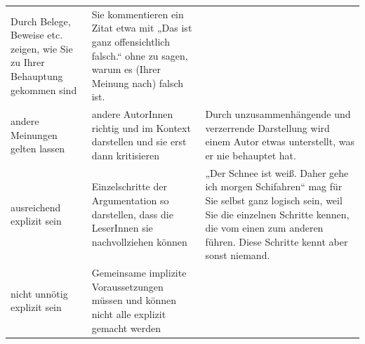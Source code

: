 \documentclass[]{book}
\theoremstyle{definition}
\theoremstyle{definition}
\theoremstyle{definition}
\theoremstyle{remark}
\begin{document}
\begin{longtable}[]{@{}lll@{}}
\begin{minipage}[t]{0.39\columnwidth}
Durch Belege, Beweise etc. zeigen, wie Sie zu Ihrer Behauptung gekommen
sind\strut
\end{minipage} & \begin{minipage}[t]{0.33\columnwidth}\raggedright\strut
Sie kommentieren ein Zitat etwa mit „Das ist ganz offensichtlich
falsch.`` ohne zu sagen, warum es (Ihrer Meinung nach) falsch ist.
\vspace{-6mm}\strut
\end{minipage}\tabularnewline
\begin{minipage}[t]{0.19\columnwidth}\raggedright\strut
andere Meinungen gelten lassen\strut
\end{minipage} & \begin{minipage}[t]{0.39\columnwidth}\raggedright\strut
andere AutorInnen richtig und im Kontext darstellen und sie erst dann
kritisieren\strut
\end{minipage} & \begin{minipage}[t]{0.33\columnwidth}\raggedright\strut
Durch unzusammenhängende und verzerrende Darstellung wird einem Autor
etwas unterstellt, was er nie behauptet hat. \vspace{-6mm}\strut
\end{minipage}\tabularnewline
\begin{minipage}[t]{0.19\columnwidth}\raggedright\strut
ausreichend explizit sein\strut
\end{minipage} & \begin{minipage}[t]{0.39\columnwidth}\raggedright\strut
Einzelschritte der Argumentation so darstellen, dass die LeserInnen sie
nachvollziehen können\strut
\end{minipage} & \begin{minipage}[t]{0.33\columnwidth}\raggedright\strut
„Der Schnee ist weiß. Daher gehe ich morgen Schifahren`` mag für Sie
selbst ganz logisch sein, weil Sie die einzelnen Schritte kennen, die
vom einen zum anderen führen. Diese Schritte kennt aber sonst niemand.
\vspace{-6mm}\strut
\end{minipage}\tabularnewline
\begin{minipage}[t]{0.19\columnwidth}\raggedright\strut
nicht unnötig explizit sein\strut
\end{minipage} & \begin{minipage}[t]{0.39\columnwidth}\raggedright\strut
Gemeinsame implizite Voraussetzungen müssen und können nicht alle
explizit gemacht werden\strut
\end{minipage} & \begin{minipage}[t]{0.33\columnwidth}\raggedright\strut

\end{minipage}
\end{longtable}
\end{document}
